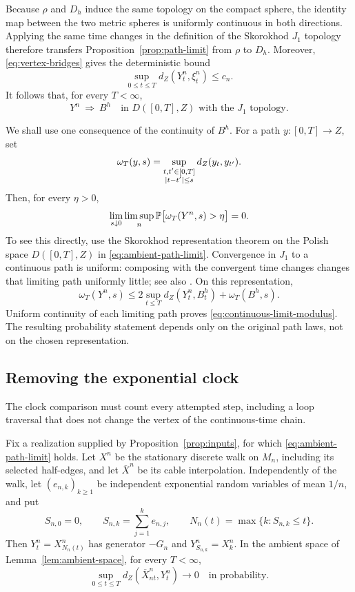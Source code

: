 Because $\rho$ and $D_h$ induce the same topology on the compact sphere,
the identity map between the two metric spheres is uniformly continuous
in both directions.  Applying the same time changes in the definition
of the Skorokhod $J_1$ topology therefore transfers
Proposition~\ref{prop:path-limit} from $\rho$ to $D_h$.  Moreover,
\eqref{eq:vertex-bridges} gives the deterministic bound
\[
 \sup_{0\le t\le T}d_Z(Y^n_t,\xi^n_t)\le c_n.
\]
It follows that, for every $T<\infty$,
\begin{equation}\label{eq:ambient-path-limit}
 Y^n\ \Longrightarrow\ B^h
 \quad\text{in }D([0,T],Z)\text{ with the }J_1\text{ topology}.
\end{equation}

We shall use one consequence of the continuity of $B^h$.  For a path
$y:[0,T]\to Z$, set
\[
 \omega_T(y,s)=
 \sup_{\substack{t,t'\in[0,T]\\\lvert t-t'\rvert\le s}}
    d_Z(y_t,y_{t'}).
\]
Then, for every $\eta>0$,
\begin{equation}\label{eq:continuous-limit-modulus}
 \lim_{s\downarrow0}\limsup_n
 \mathbb P\bigl[\omega_T(Y^n,s)>\eta\bigr]=0.
\end{equation}
To see this directly, use the Skorokhod representation theorem
\cite[Theorem~6.7]{Billingsley1999} on the Polish space $D([0,T],Z)$ in
\eqref{eq:ambient-path-limit}.  Convergence in $J_1$ to a continuous
path is uniform: composing with the convergent time changes changes that
limiting path uniformly little; see also
\cite[Section~12, p.~124]{Billingsley1999}.  On this representation,
\[
 \omega_T(Y^n,s)\le
 2\sup_{t\le T}d_Z(Y^n_t,B^h_t)+\omega_T(B^h,s).
\]
Uniform continuity of each limiting path proves
\eqref{eq:continuous-limit-modulus}.  The resulting probability statement
depends only on the original path laws, not on the chosen representation.

\subsection{Removing the exponential clock}

The clock comparison must count every attempted step, including a loop
traversal that does not change the vertex of the continuous-time chain.

\begin{lemma}\label{lem:clock}
Fix a realization supplied by Proposition~\ref{prop:inputs}, for which
\eqref{eq:ambient-path-limit} holds.  Let $X^n$ be the stationary discrete
walk on $M_n$, including its selected half-edges, and let $\overline X^n$
be its cable interpolation.  Independently of the walk, let
$(e_{n,k})_{k\ge1}$ be
independent exponential random variables of mean $1/n$, and put
\[
 S_{n,0}=0,\qquad S_{n,k}=\sum_{j=1}^k e_{n,j},\qquad
 N_n(t)=\max\{k:S_{n,k}\le t\}.
\]
Then $Y^n_t=X^n_{N_n(t)}$ has generator $-G_n$ and
$Y^n_{S_{n,k}}=X^n_k$.  In the ambient space of
Lemma~\ref{lem:ambient-space}, for every $T<\infty$,
\begin{equation}\label{eq:clock-comparison}
 \sup_{0\le t\le T}
 d_Z(\overline X^n_{nt},Y^n_t)\longrightarrow0
 \quad\text{in probability}.
\end{equation}
\end{lemma}

